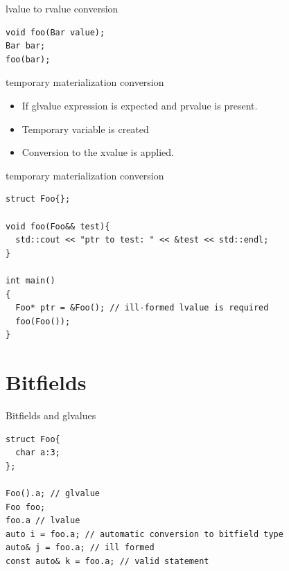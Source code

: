 \documentclass[10pt]{beamer}
\begin{document}

\begin{frame}[fragile]{lvalue to rvalue conversion}
	\begin{verbatim}
void foo(Bar value);
Bar bar;
foo(bar);
	\end{verbatim}
\end{frame}

\begin{frame}{temporary materialization conversion}
	\centering
	\begin{itemize}
		\item If glvalue expression is expected and prvalue is present.
		\item Temporary variable is created
		\item Conversion to the xvalue is applied.
	\end{itemize}
\end{frame}

\begin{frame}[fragile]{temporary materialization conversion}
	\begin{verbatim}
struct Foo{};	
	
void foo(Foo&& test){
  std::cout << "ptr to test: " << &test << std::endl;
}

int main()
{
  Foo* ptr = &Foo(); // ill-formed lvalue is required
  foo(Foo());
}
	\end{verbatim}
\end{frame}

\section{Bitfields}

\begin{frame}[fragile]{Bitfields and glvalues}
	\begin{verbatim}
struct Foo{
  char a:3;
};

Foo().a; // glvalue 
Foo foo;
foo.a // lvalue
auto i = foo.a; // automatic conversion to bitfield type
auto& j = foo.a; // ill formed
const auto& k = foo.a; // valid statement

	\end{verbatim}
\end{frame}
\end{document}
